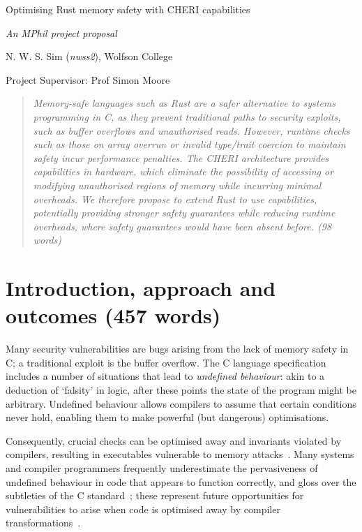 \documentclass[11pt]{article}
\begin{document}
\centerline{\Large Optimising Rust memory safety with CHERI capabilities}
\vspace{2em}
\centerline{\Large \emph{An MPhil project proposal}}
\vspace{2em}
\centerline{\large N. W. S. Sim (\emph{nwss2}), Wolfson College}
\vspace{1em}
\centerline{\large Project Supervisor: Prof Simon Moore}
\vspace{1em}

\begin{abstract}
\textsl{
Memory-safe languages such as Rust are a safer alternative to systems programming in C, as they prevent traditional paths to security exploits, such as buffer overflows and unauthorised reads.
However, runtime checks such as those on array overrun or invalid type/trait coercion to maintain safety incur performance penalties.
The CHERI architecture provides \emph{capabilities} in hardware, which eliminate the possibility of accessing or modifying unauthorised regions of memory while incurring minimal overheads.
We therefore propose to extend Rust to use capabilities, potentially providing stronger safety guarantees while reducing runtime overheads, where safety guarantees would have been absent before.
(98 words)} 
\end{abstract}

\section{Introduction, approach and outcomes (457 words)}

Many security vulnerabilities are bugs arising from the lack of memory safety in C; a traditional exploit is the buffer overflow.
The C language specification includes a number of situations that lead to \emph{undefined behaviour}: akin to a deduction of `falsity' in logic, after these points the state of the program might be arbitrary.
Undefined behaviour allows compilers to assume that certain conditions never hold, enabling them to make powerful (but dangerous) optimisations.

Consequently, crucial checks can be optimised away and invariants violated by compilers, resulting in executables vulnerable to memory attacks~\cite{simon2018wygiwyc}.
Many systems and compiler programmers frequently underestimate the pervasiveness of undefined behaviour in code that appears to function correctly, and gloss over the subtleties of the C standard~\cite{memarian2016cdepths};
these represent future opportunities for vulnerabilities to arise when code is optimised away by compiler transformations~\cite{wang2013towards}.
\end{document}
